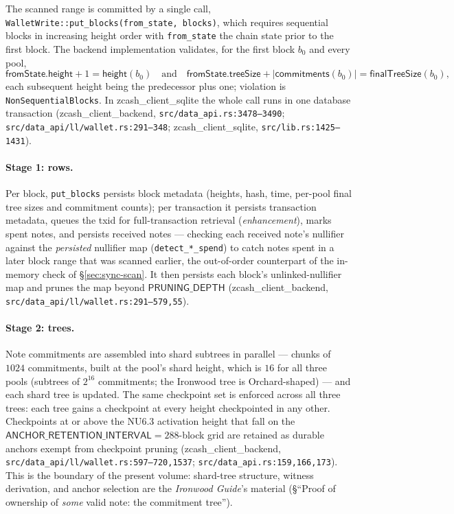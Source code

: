 \documentclass[11pt,a4paper]{article}
\theoremstyle{definition}
\begin{document}
The scanned range is committed by a single call,
\texttt{WalletWrite::put\_blocks(from\_state, blocks)}, which requires
sequential blocks in increasing height order with \texttt{from\_state} the
chain state prior to the first block. The backend implementation validates,
for the first block $b_0$ and every pool,
\[
\mathsf{fromState.height} + 1 = \mathsf{height}(b_0)
\quad\text{and}\quad
\mathsf{fromState.treeSize} + |\mathsf{commitments}(b_0)| =
\mathsf{finalTreeSize}(b_0),
\]
each subsequent height being the predecessor plus one; violation is
\texttt{NonSequentialBlocks}. In \textsf{zcash\_client\_sqlite} the whole
call runs in one database transaction
(\textsf{zcash\_client\_backend}, \texttt{src/data\_api.rs:3478--3490};
\texttt{src/data\_api/ll/wallet.rs:291--348};
\textsf{zcash\_client\_sqlite}, \texttt{src/lib.rs:1425--1431}).

\paragraph{Stage 1: rows.} Per block, \texttt{put\_blocks} persists block
metadata (heights, hash, time, per-pool final tree sizes and commitment
counts); per transaction it persists transaction metadata, queues the txid
for full-transaction retrieval (\emph{enhancement}), marks spent notes, and
persists received notes --- checking each received note's nullifier against
the \emph{persisted} nullifier map (\texttt{detect\_*\_spend}) to catch
notes spent in a later block range that was scanned earlier, the
out-of-order counterpart of the in-memory check of \S\ref{sec:sync-scan}.
It then persists each block's unlinked-nullifier map and prunes the map
beyond $\mathsf{PRUNING\_DEPTH}$
(\textsf{zcash\_client\_backend},
\texttt{src/data\_api/ll/wallet.rs:291--579,55}).

\paragraph{Stage 2: trees.} Note commitments are assembled into shard
subtrees in parallel --- chunks of $1024$ commitments, built at the pool's
shard height, which is $16$ for all three pools (subtrees of $2^{16}$
commitments; the Ironwood tree is Orchard-shaped) --- and each shard tree
is updated. The same checkpoint set is enforced across all three trees:
each tree gains a checkpoint at every height checkpointed in any other.
Checkpoints at or above the NU6.3 activation height that fall on the
$\mathsf{ANCHOR\_RETENTION\_INTERVAL} = 288$-block grid are retained as
durable anchors exempt from checkpoint pruning
(\textsf{zcash\_client\_backend},
\texttt{src/data\_api/ll/wallet.rs:597--720,1537};
\texttt{src/data\_api.rs:159,166,173}). This is the boundary of the present
volume: shard-tree structure, witness derivation, and anchor selection are
the \emph{Ironwood Guide}'s material (\S``Proof of ownership of \emph{some}
valid note: the commitment tree'').
\end{document}
